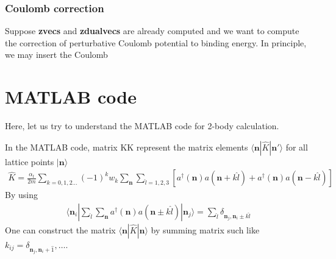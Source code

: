 \documentclass[10pt]{book}
\def\bm{\boldsymbol}
\newcommand{\bea}{\begin{eqnarray}}
\newcommand{\eea}{\end{eqnarray}}
\def\vn{{\bm n}}
\def\la{\langle}
\def\ra{\rangle}
\begin{document}
\subsection{Coulomb correction} 

Suppose {\bf zvecs} and {\bf zdualvecs} are already computed and we want to 
compute the correction of perturbative Coulomb potential to binding energy.
In principle, we may insert the Coulomb  



\chapter{MATLAB code} 

Here, let us try to understand the MATLAB code for 2-body calculation. 

In the MATLAB code, matrix KK represent the matrix elements $\la \vn| \hat{K}|\vn'\ra $
for all lattice points $|\vn\ra$
\bea 
\hat{K}=\frac{\alpha_t}{2m}\sum_{k=0,1,2\dots}(-1)^k w_k \sum_{\vn}\sum_{\hat{l}=1,2,3}
             \left[a^\dagger(\vn)a(\vn+k\hat{l})+  a^\dagger(\vn)a(\vn-k\hat{l})\right] 
\eea 
By using  
\bea 
\la \vn_i| \sum_{\hat{l}}\sum_{\vn}  a^\dagger(\vn) a(\vn\pm k\hat{l})|\vn_j\ra 
=\sum_{\hat{l}}\delta_{\vn_j, \vn_i\pm k\hat{l}}
\eea 
One can construct the matrix $\la \vn|\hat{K}|\vn\ra$ by summing matrix such like 
$k_{ij}= \delta_{\vn_j,\vn_i+\hat{1}},\dots$. 
\end{document}

